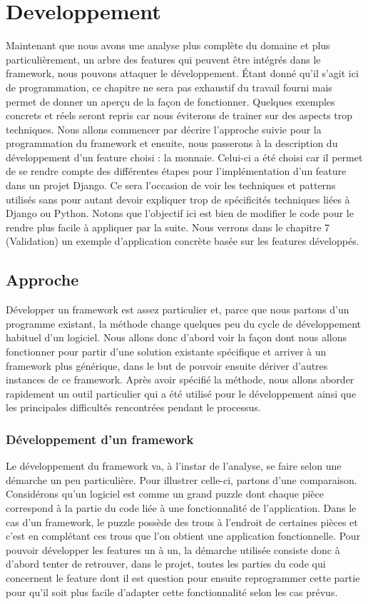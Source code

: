 \section{Developpement}

Maintenant que nous avons une analyse plus complète du domaine et plus particulièrement,  un arbre des features qui peuvent être intégrés dans le framework,  nous pouvons attaquer le développement.  Étant donné qu'il s'agit ici de programmation,  ce chapitre ne sera pas exhaustif du travail fourni mais permet de donner un aperçu de la façon de fonctionner.  Quelques exemples concrets et réels seront repris car nous éviterons de trainer sur des aspects trop techniques.  Nous allons commencer par décrire l'approche suivie pour la programmation du framework et ensuite,   nous passerons à la description du développement d'un feature choisi : la monnaie.  Celui-ci a été choisi car il permet de se rendre compte des différentes étapes pour l'implémentation d'un feature dans un projet Django.  Ce sera l'occasion de voir les techniques et patterns utilisés sans pour autant devoir expliquer trop de spécificités techniques liées à Django ou Python.  Notons que l'objectif ici est bien de modifier le code pour le rendre plus facile à appliquer par la suite.  Nous verrons dans le chapitre 7 (Validation) un exemple d'application concrète basée sur les features développés.   

\subsection{Approche}
Développer un framework est assez particulier et,  parce que nous partons d'un programme existant,  la méthode change quelques peu du cycle de développement habituel d'un logiciel.  Nous allons donc d'abord voir la façon dont nous allons fonctionner pour partir d'une solution existante spécifique et arriver à un framework plus générique,  dans le but de pouvoir ensuite dériver d'autres instances de ce framework.  Après avoir spécifié la méthode,  nous allons aborder rapidement un outil particulier qui a été utilisé pour le développement ainsi que les principales difficultés rencontrées pendant le processus.

\subsubsection{Développement d'un framework}

Le développement du framework va,  à l'instar de l'analyse,  se faire selon une démarche un peu particulière.  Pour illustrer celle-ci,  partons d'une comparaison.  Considérons qu'un logiciel est  comme un grand puzzle dont chaque pièce correspond à la partie du code liée à une fonctionnalité de l'application.  Dans le cas d'un framework,  le puzzle possède des trous à l'endroit de certaines pièces et c'est en complétant ces trous que l'on obtient une application fonctionnelle.  Pour pouvoir développer les features un à un,  la démarche utilisée consiste donc à d'abord tenter de retrouver,  dans le projet,  toutes les parties du code qui concernent le feature dont il est question pour ensuite reprogrammer cette partie pour qu'il soit plus facile d'adapter cette fonctionnalité selon les cas prévus.

